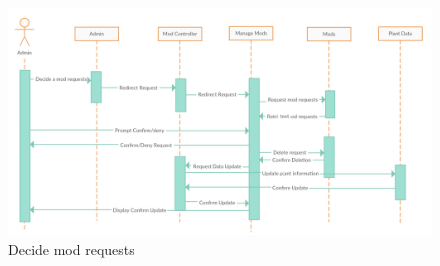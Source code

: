 \documentclass[]{article}
\begin{document}
\begin{figure}[h!]
\centering
\includegraphics[scale=0.5]{Decideanrequests.png}
\caption{Decide mod requests}
\label{fig:s9}
\end{figure}
\clearpage
\end{document}
